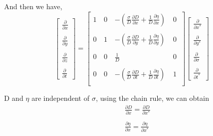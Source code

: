 \documentclass[oribibl]{llncs}
\begin{document}
And then we have,
\begin{equation}      
\left[                 
  \begin{array}{c}  
    \frac{\partial}{\partial x}  \\  \nonumber \\ 
    \frac{\partial}{\partial y}  \\ \nonumber \\ 
    \frac{\partial}{\partial z}  \\ \nonumber \\ 
    \frac{\partial}{\partial t} 
  \end{array}
\right]
=  
\left[             
  \begin{array}{cccc}  
   1\  & 0\ & -\left( \frac{\sigma}{D} \frac{\partial D}{\partial x} + \frac{1}{D}\frac{\partial \eta}{\partial x} \right)\ & 0\ \\   \nonumber \\ 
   0\  & 1\ & -\left(\frac{\sigma}{D} \frac{\partial D}{\partial y} + \frac{1}{D}\frac{\partial \eta}{\partial y} \right)\ & 0\ \\   \nonumber \\ 
   0\  & 0\ & \frac{1}{D} \													        & 0 \ \\   \nonumber \\ 
   0\  & 0\ & -\left(\frac{\sigma}{D} \frac{\partial D}{\partial t} + \frac{1}{D}\frac{\partial \eta}{\partial t} \right)\   & 1\ \\  
  \end{array}
\right]              
\left[                 
  \begin{array}{c}  
    \frac{\partial}{\partial x^*}  \\  \nonumber \\ 
    \frac{\partial}{\partial y^*}  \\ \nonumber \\ 
    \frac{\partial}{\partial \sigma}  \\ \nonumber \\ 
    \frac{\partial}{\partial t^*} 
  \end{array}
\right]
\end{equation}

D and $\eta$ are independent of $\sigma$, using the chain rule, we can obtain
\begin{eqnarray}  
&& \frac{\partial D}{\partial x}= \frac{\partial D}{\partial x^*}  \nonumber \\ \nonumber \\ 
&& \frac{\partial \eta}{\partial x}= \frac{\partial \eta}{\partial x^*}  \nonumber
\end{eqnarray}  
\end{document}

